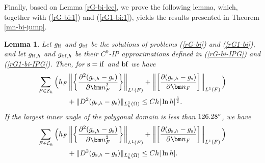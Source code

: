 \documentclass[1996/10/24]{amsart}
\newtheorem{lemma}[theorem]{Lemma}
\theoremstyle{definition}
\numberwithin{equation}{section}
\begin{document}
Finally, based on Lemma \ref{rG-bi-lee}, we prove the following lemma, which, together with (\ref{rG-bi:1}) and (\ref{rG1-bi:1}), yields the results
presented in Theorem \ref{mn-bi-jump}.
\begin{lemma}\label{rG-bi-L1}
Let $g_{{\rm if}}$ and $g_{{\rm bf}}$ be the solutions of problems (\ref{rG-bi}) and (\ref{rG1-bi}), and let $g_{{\rm if},h}$ and $g_{{\rm bf},h}$ be their
$C^0$-IP approximations defined in (\ref{rG-bi-IPG}) and (\ref{rG1-bi-IPG}). Then, for ${\rm s=if}$ and ${\rm bf}$ we have
\begin{align}
\sum_{F\in\mathcal{E}_h}\Big(h_F&\left\|\left\{\frac{\partial^2(g_{{\rm s},h}-g_{{\rm s}})}{\partial{\bm n}_F^2}\right\}\right\|_{L^1(F)}+\left\|\left[\frac{\partial(g_{{\rm s},h}-g_{{\rm s}})}{\partial{\bm n}_F}\right]\right\|_{L^1(F)}\Big)\nonumber\\
&+\|D^2(g_{{\rm s},h}-g_{{\rm s}})\|_{L_h^1(\Omega)}\leq Ch|\ln h|^{\frac{3}{2}}.
\end{align}
If the largest inner angle of the polygonal domain is less than ${\rm 126.28^\circ}$, we have
\begin{align}
\sum_{F\in\mathcal{E}_h}\Big(h_F&\left\|\left\{\frac{\partial^2(g_{{\rm s},h}-g_{{\rm s}})}{\partial{\bm n}_F^2}\right\}\right\|_{L^1(F)}+\left\|\left[\frac{\partial(g_{{\rm s},h}-g_{{\rm s}})}{\partial{\bm n}_F}\right]\right\|_{L^1(F)}\Big)\nonumber\\
&+\|D^2(g_{{\rm s},h}-g_{{\rm s}})\|_{L_h^1(\Omega)}\leq Ch|\ln h|.
\end{align}
\end{lemma}
\end{document}
